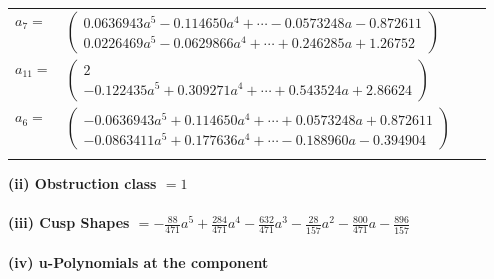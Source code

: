 \documentclass[1p]{elsarticle_modified}
\theoremstyle{definition}
\begin{document}
\begin{tabular}{m{7pt} m{180pt} m{7pt} m{180pt} }
\flushright $a_{7}=$&$\begin{pmatrix}0.0636943 a^{5}-0.114650 a^{4}+\cdots-0.0573248 a-0.872611\\0.0226469 a^{5}-0.0629866 a^{4}+\cdots+0.246285 a+1.26752\end{pmatrix}$ \\
\flushright $a_{11}=$&$\begin{pmatrix}2\\-0.122435 a^{5}+0.309271 a^{4}+\cdots+0.543524 a+2.86624\end{pmatrix}$ \\
\flushright $a_{6}=$&$\begin{pmatrix}-0.0636943 a^{5}+0.114650 a^{4}+\cdots+0.0573248 a+0.872611\\-0.0863411 a^{5}+0.177636 a^{4}+\cdots-0.188960 a-0.394904\end{pmatrix}$\\&\end{tabular}
\flushleft \textbf{(ii) Obstruction class $= 1$}\\~\\
\flushleft \textbf{(iii) Cusp Shapes $= -\frac{88}{471} a^5+\frac{284}{471} a^4-\frac{632}{471} a^3-\frac{28}{157} a^2-\frac{800}{471} a-\frac{896}{157}$}\\~\\
\newpage\renewcommand{\arraystretch}{1}
\flushleft \textbf{(iv) u-Polynomials at the component}\newline \\
\end{document}
